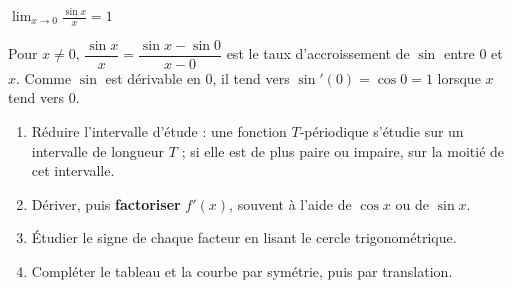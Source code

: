 \noindent
\begin{minipage}[t]{0.48\linewidth}
\centering
\begin{tableau}
\end{tableau}
\end{minipage}\hfill
\begin{minipage}[t]{0.48\linewidth}
\centering
\begin{tableau}
\end{tableau}
\end{minipage}
\par\vspace{1mm}
\begin{center}\end{center}

\begin{theoreme}
\centering $\displaystyle\lim_{x\to0}\frac{\sin x}{x}=1$
\end{theoreme}

\begin{demonstration}
Pour $x\neq0$, $\dfrac{\sin x}{x}=\dfrac{\sin x-\sin0}{x-0}$ est le taux d'accroissement de $\sin$ entre $0$ et $x$. Comme $\sin$
est dérivable en $0$, il tend vers $\sin'(0)=\cos0=1$ lorsque $x$ tend vers $0$.
\end{demonstration}

\begin{savoirfaire}
\begin{enumerate}[leftmargin=1.4em,itemsep=0.4mm,topsep=0.5mm,label={\color{otNavy}\arabic*.}]
  \item Réduire l'intervalle d'étude : une fonction $T$-périodique s'étudie sur un intervalle de longueur $T$ ; si elle est
    de plus paire ou impaire, sur la moitié de cet intervalle.
  \item Dériver, puis \textbf{factoriser} $f'(x)$, souvent à l'aide de $\cos x$ ou de $\sin x$.
  \item Étudier le signe de chaque facteur en lisant le cercle trigonométrique.
  \item Compléter le tableau et la courbe par symétrie, puis par translation.
\end{enumerate}
\end{savoirfaire}

